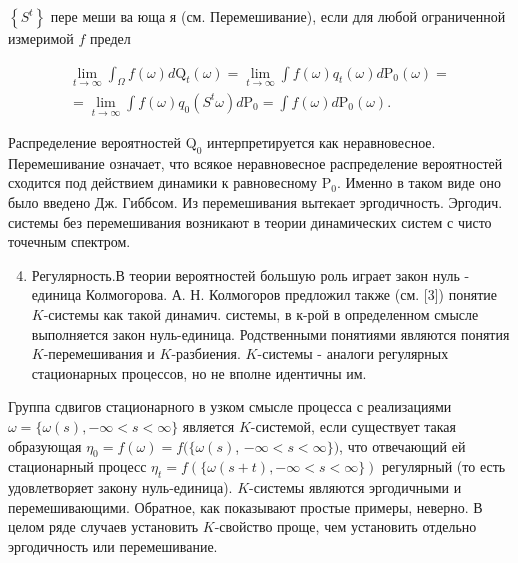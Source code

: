 \documentclass[10pt]{article}
\begin{document}
$\left\{S^{t}\right\}$ пере меши ва юща я (см. Перемешивание), если для любой ограниченной измеримой $f$ предел



\[

\begin{gathered}

\lim _{t \rightarrow \infty} \int_{\Omega} f(\omega) d \mathrm{Q}_{t}(\omega)=\lim _{t \rightarrow \infty} \int f(\omega) q_{t}(\omega) d \mathrm{P}_{0}(\omega)= \\

=\lim _{t \rightarrow \infty} \int f(\omega) q_{0}\left(S^{t} \omega\right) d \mathrm{P}_{0}=\int f(\omega) d \mathrm{P}_{0}(\omega) .

\end{gathered}

\]



Распределение вероятностей $\mathrm{Q}_{0}$ интерпретируется как неравновесное. Перемешивание означает, что всякое неравновесное распределение вероятностей сходится под действием динамики к равновесному $\mathrm{P}_{0}$. Именно в таком виде оно было введено Дж. Гиббсом. Из перемешивания вытекает эргодичность. Эргодич. системы без перемешивания возникают в теории динамических систем с чисто точечным спектром.



\begin{enumerate}

  \setcounter{enumi}{3}

  \item Регулярность.В теории вероятностей большую роль играет закон нуль - единица Колмогорова. А. Н. Колмогоров предложил также (см. [3]) понятие $K$-системы как такой динамич. системы, в к-рой в определенном смысле выполняется закон нуль-единица. Родственными понятиями являются понятия $K$-перемешивания и $K$-разбиения. $K$-системы - аналоги регулярных стационарных процессов, но не вполне идентичны им.

\end{enumerate}



Группа сдвигов стационарного в узком смысле процесса с реализациями $\omega=\{\omega(s),-\infty<s<\infty\}$ является $K$-системой, если существует такая образующая $\eta_{0}=f(\omega)=f(\{\omega(s)$, $-\infty<s<\infty\})$, что отвечающий ей стационарный процесс $\eta_{t}=f(\{\omega(s+t),-\infty<s<\infty\})$ регулярный (то есть удовлетворяет закону нуль-единица). $K$-системы являются эргодичными и перемешивающими. Обратное, как показывают простые примеры, неверно. В целом ряде случаев установить $K$-свойство проще, чем установить отдельно эргодичность или перемешивание.
\end{document}
